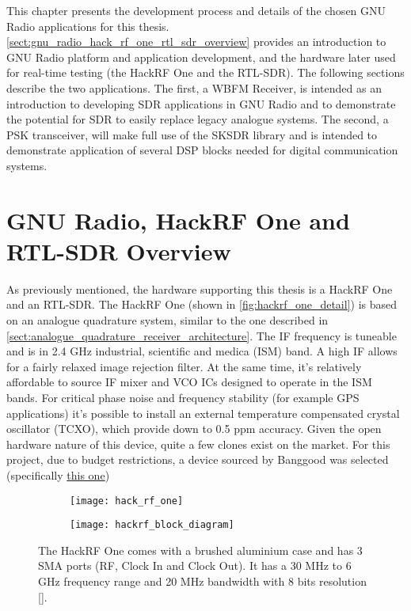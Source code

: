 This chapter presents the development process and details of the chosen GNU Radio applications for this thesis. \autoref{sect:gnu_radio_hack_rf_one_rtl_sdr_overview} provides an introduction to GNU Radio platform and application development, and the hardware later used for real-time testing (the HackRF One and the RTL-SDR). The following sections describe the two applications. The first, a WBFM Receiver, is intended as an introduction to developing SDR applications in GNU Radio and to demonstrate the potential for SDR to easily replace legacy analogue systems. The second, a PSK transceiver, will make full use of the SKSDR library and is intended to demonstrate application of several DSP blocks needed for digital communication systems.

\section{GNU Radio, HackRF One and RTL-SDR Overview}
\label{sect:gnu_radio_hack_rf_one_rtl_sdr_overview}

As previously mentioned, the hardware supporting this thesis is a HackRF One and an RTL-SDR. The HackRF One (shown in \autoref{fig:hackrf_one_detail}) is based on an analogue quadrature system, similar to the one described in \autoref{sect:analogue_quadrature_receiver_architecture}. The IF frequency is tuneable and is in 2.4 GHz industrial, scientific and medica (ISM) band. A high IF allows for a fairly relaxed image rejection filter. At the same time, it's relatively affordable to source IF mixer and VCO ICs designed to operate in the ISM bands. For critical phase noise and frequency stability (for example GPS applications) it's possible to install an external temperature compensated crystal oscillator (TCXO), which provide down to 0.5 ppm accuracy. Given the open hardware nature of this device, quite a few clones exist on the market. For this project, due to budget restrictions, a device sourced by Banggood was selected (specifically \href{https://pt.banggood.com/HackRF-One-1MHz-6GHz-Radio-Platform-Development-Board-Software-Defined-RTL-SDR-Demoboard-Kit-Dongle-Receiver-Ham-Radio-p-1552853.html}{this one})

\begin{figure} [ht]
  \begin{subfigure}{.5\textwidth}
    \centering
    \texttt{[image: hack\_rf\_one]}
    \label{fig:hackrf_one_case}
  \end{subfigure}
  \begin{subfigure}{.5\textwidth}
    \centering
    \texttt{[image: hackrf\_block\_diagram]}
    \label{fig:hackrf_one_block_diagram}
  \end{subfigure}
  \caption[The HackRF One case and block diagram]{The HackRF One comes with a brushed aluminium case and has 3 SMA ports (RF, Clock In and Clock Out). It has a 30 MHz to 6 GHz frequency range and 20 MHz bandwidth with 8 bits resolution [\citeauthor{hackrf_one_product}].}
  \label{fig:hackrf_one_detail}
\end{figure}

